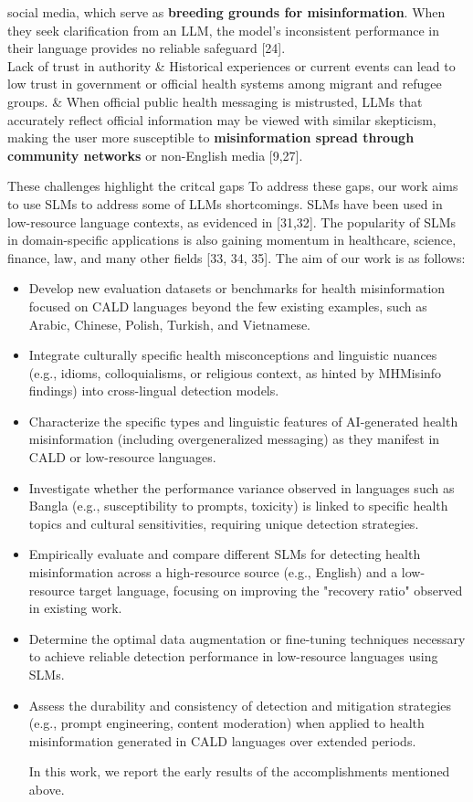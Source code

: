 \documentclass[]{article}
\begin{document}
{\begin{longtable}[]
social media, which serve as \textbf{breeding grounds for
misinformation}. When they seek clarification from an LLM, the model's
inconsistent performance in their language provides no reliable
safeguard {[}24{]}. \\
Lack of trust in authority & Historical experiences or current events
can lead to low trust in government or official health systems among
migrant and refugee groups. & When official public health messaging is
mistrusted, LLMs that accurately reflect official information may be
viewed with similar skepticism, making the user more susceptible to
\textbf{misinformation spread through community networks} or non-English
media {[}9,27{]}. \\
\end{longtable}
}

These challenges highlight the critcal gaps To address these gaps, our
work aims to use SLMs to address some of LLMs\textquotesingle{}
shortcomings. SLMs have been used in low-resource language contexts, as
evidenced in {[}31,32{]}. The popularity of SLMs in domain-specific
applications is also gaining momentum in healthcare, science, finance,
law, and many other fields {[}33, 34, 35{]}. The aim of our work is as
follows:

\begin{itemize}
\item
  Develop new evaluation datasets or benchmarks for health
  misinformation focused on CALD languages beyond the few existing
  examples, such as Arabic, Chinese, Polish, Turkish, and Vietnamese.
\item
  Integrate culturally specific health misconceptions and linguistic
  nuances (e.g., idioms, colloquialisms, or religious context, as hinted
  by MHMisinfo findings) into cross-lingual detection models.
\item
  Characterize the specific types and linguistic features of
  AI-generated health misinformation (including overgeneralized
  messaging) as they manifest in CALD or low-resource languages.
\item
  Investigate whether the performance variance observed in languages
  such as Bangla (e.g., susceptibility to prompts, toxicity) is linked
  to specific health topics and cultural sensitivities, requiring unique
  detection strategies.
\item
  Empirically evaluate and compare different SLMs for detecting health
  misinformation across a high-resource source (e.g., English) and a
  low-resource target language, focusing on improving the "recovery
  ratio" observed in existing work.
\item
  Determine the optimal data augmentation or fine-tuning techniques
  necessary to achieve reliable detection performance in low-resource
  languages using SLMs.
\item
  Assess the durability and consistency of detection and mitigation
  strategies (e.g., prompt engineering, content moderation) when applied
  to health misinformation generated in CALD languages over extended
  periods.

  In this work, we report the early results of the accomplishments
  mentioned above.
\end{itemize}
\end{document}
